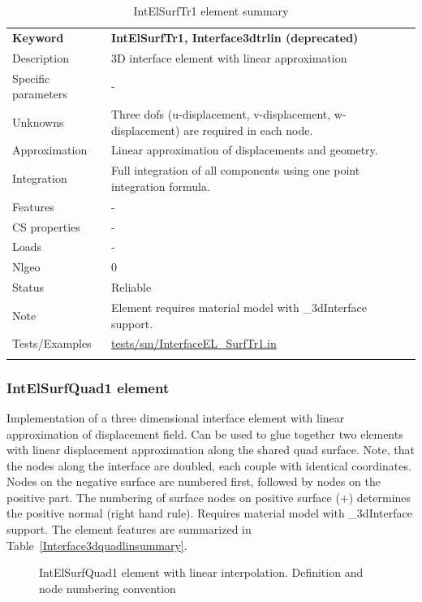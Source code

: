 \documentclass[a4paper]{article}
\newcommand{\param}[1]{\texttt{#1}} %
\newcommand{\templabel}{}%
\newcommand{\tempcaption}{}%
\newcounter{nelpar}
\newenvironment{elementsummary}[5]{%
  \gdef\tempcaption{#4}%
  \gdef\templabel{#5}%
  \setcounter{nelpar}{0}%
  \begin{center} %
    \begin{table}[!htb] %
      \begin{tabular}{|l|p{9cm}|}\hline %
        {\bf Keyword} & \bf{#1}\\ %
        {Description} & {#2}\\ %
        {Specific parameters} & {#3}\\ \hline %
}{
  \\ \hline %
      \end{tabular}%
      \caption{\tempcaption}%
      \label{\templabel}%
    \end{table}%
  \end{center}%
}
\newcommand{\elementParam}[1]{%
  \ifthenelse{\value{nelpar}>0} %
             {&{#1}}%
             {\setcounter{nelpar}{1}Parameters&{#1}}%
             \\%
}
\newcommand{\elementDescription}[2]{{#1} & {#2}\\}
\begin{document}
\begin{elementsummary}{IntElSurfTr1, Interface3dtrlin (deprecated)}{3D  interface element with linear approximation}{-}{IntElSurfTr1 element summary}{Interface3dtrlinsummary}
\elementDescription{Unknowns}{Three dofs (u-displacement, v-displacement, w-displacement) are required in each node.}
\elementDescription{Approximation}{Linear approximation of displacements and geometry.}
\elementDescription{Integration}{Full integration of all components using one point integration formula.}
\elementDescription{Features}{-}
\elementDescription{CS properties}{-}
\elementDescription{Loads}{-}
\elementDescription{Nlgeo}{0}
\elementDescription{Status}{Reliable}
\elementDescription{Note}{Element requires material model with \_3dInterface support.}
\elementDescription{Tests/Examples}{\href{https://github.com/oofem/oofem/blob/devel/tests/sm/InterfaceEL\_SurfTr1.in}{tests/sm/InterfaceEL\_SurfTr1.in}}
\end{elementsummary}

\subsubsection{IntElSurfQuad1 element}
Implementation of a three dimensional interface element with linear
approximation of displacement field. Can be used to glue together two elements with linear displacement approximation along the shared quad surface. Note, that the nodes along the interface are doubled, each couple with identical coordinates. Nodes on the negative surface are numbered first, followed by nodes on the positive part. The numbering of surface nodes on positive surface (+) determines the positive normal (right hand rule). Requires material model with \_3dInterface support. The element features are summarized in Table~\ref{Interface3dquadlinsummary}.

\begin{figure}[htb]
 \centering
 \begin{makeimage}
  
 \end{makeimage}
 \caption{IntElSurfQuad1 element with linear interpolation. Definition and node numbering convention}
 \label{interf3dquad_lin_fig}
\end{figure}
\end{document}
